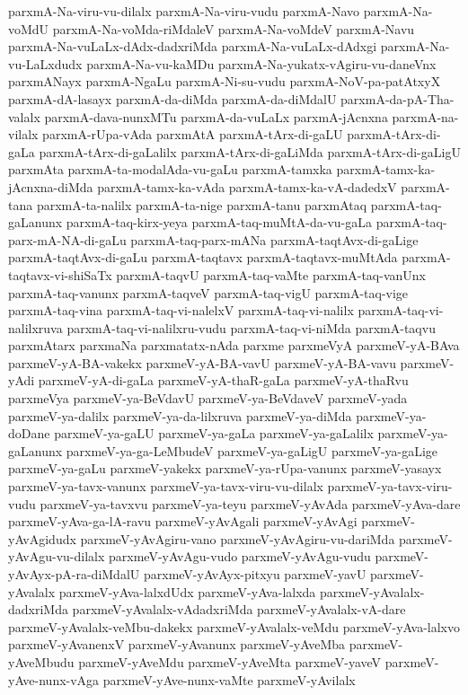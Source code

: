 {parxmA-Na-viru-vu-dilalx
parxmA-Na-viru-vudu
parxmA-Navo
parxmA-Na-voMdU
parxmA-Na-voMda-riMdaleV
parxmA-Na-voMdeV
parxmA-Navu
parxmA-Na-vuLaLx-dAdx-dadxriMda
parxmA-Na-vuLaLx-dAdxgi
parxmA-Na-vu-LaLxdudx
parxmA-Na-vu-kaMDu
parxmA-Na-yukatx-vAgiru-vu-daneVnx
parxmANayx
parxmA-NgaLu
parxmA-Ni-su-vudu
parxmA-NoV-pa-patAtxyX
parxmA-dA-lasayx
parxmA-da-diMda
parxmA-da-diMdalU
parxmA-da-pA-Tha-valalx
parxmA-dava-nunxMTu
parxmA-da-vuLaLx
parxmA-jAcnxna
parxmA-na-vilalx
parxmA-rUpa-vAda
parxmAtA
parxmA-tArx-di-gaLU
parxmA-tArx-di-gaLa
parxmA-tArx-di-gaLalilx
parxmA-tArx-di-gaLiMda
parxmA-tArx-di-gaLigU
parxmAta
parxmA-ta-modalAda-vu-gaLu
parxmA-tamxka
parxmA-tamx-ka-jAcnxna-diMda
parxmA-tamx-ka-vAda
parxmA-tamx-ka-vA-dadedxV
parxmA-tana
parxmA-ta-nalilx
parxmA-ta-nige
parxmA-tanu
parxmAtaq
parxmA-taq-gaLanunx
parxmA-taq-kirx-yeya
parxmA-taq-muMtA-da-vu-gaLa
parxmA-taq-parx-mA-NA-di-gaLu
parxmA-taq-parx-mANa
parxmA-taqtAvx-di-gaLige
parxmA-taqtAvx-di-gaLu
parxmA-taqtavx
parxmA-taqtavx-muMtAda
parxmA-taqtavx-vi-shiSaTx
parxmA-taqvU
parxmA-taq-vaMte
parxmA-taq-vanUnx
parxmA-taq-vanunx
parxmA-taqveV
parxmA-taq-vigU
parxmA-taq-vige
parxmA-taq-vina
parxmA-taq-vi-nalelxV
parxmA-taq-vi-nalilx
parxmA-taq-vi-nalilxruva
parxmA-taq-vi-nalilxru-vudu
parxmA-taq-vi-niMda
parxmA-taqvu
parxmAtarx
parxmaNa
parxmatatx-nAda
parxme
parxmeVyA
parxmeV-yA-BAva
parxmeV-yA-BA-vakekx
parxmeV-yA-BA-vavU
parxmeV-yA-BA-vavu
parxmeV-yAdi
parxmeV-yA-di-gaLa
parxmeV-yA-thaR-gaLa
parxmeV-yA-thaRvu
parxmeVya
parxmeV-ya-BeVdavU
parxmeV-ya-BeVdaveV
parxmeV-yada
parxmeV-ya-dalilx
parxmeV-ya-da-lilxruva
parxmeV-ya-diMda
parxmeV-ya-doDane
parxmeV-ya-gaLU
parxmeV-ya-gaLa
parxmeV-ya-gaLalilx
parxmeV-ya-gaLanunx
parxmeV-ya-ga-LeMbudeV
parxmeV-ya-gaLigU
parxmeV-ya-gaLige
parxmeV-ya-gaLu
parxmeV-yakekx
parxmeV-ya-rUpa-vanunx
parxmeV-yasayx
parxmeV-ya-tavx-vanunx
parxmeV-ya-tavx-viru-vu-dilalx
parxmeV-ya-tavx-viru-vudu
parxmeV-ya-tavxvu
parxmeV-ya-teyu
parxmeV-yAvAda
parxmeV-yAva-dare
parxmeV-yAva-ga-lA-ravu
parxmeV-yAvAgali
parxmeV-yAvAgi
parxmeV-yAvAgidudx
parxmeV-yAvAgiru-vano
parxmeV-yAvAgiru-vu-dariMda
parxmeV-yAvAgu-vu-dilalx
parxmeV-yAvAgu-vudo
parxmeV-yAvAgu-vudu
parxmeV-yAvAyx-pA-ra-diMdalU
parxmeV-yAvAyx-pitxyu
parxmeV-yavU
parxmeV-yAvalalx
parxmeV-yAva-lalxdUdx
parxmeV-yAva-lalxda
parxmeV-yAvalalx-dadxriMda
parxmeV-yAvalalx-vAdadxriMda
parxmeV-yAvalalx-vA-dare
parxmeV-yAvalalx-veMbu-dakekx
parxmeV-yAvalalx-veMdu
parxmeV-yAva-lalxvo
parxmeV-yAvanenxV
parxmeV-yAvanunx
parxmeV-yAveMba
parxmeV-yAveMbudu
parxmeV-yAveMdu
parxmeV-yAveMta
parxmeV-yaveV
parxmeV-yAve-nunx-vAga
parxmeV-yAve-nunx-vaMte
parxmeV-yAvilalx
}
